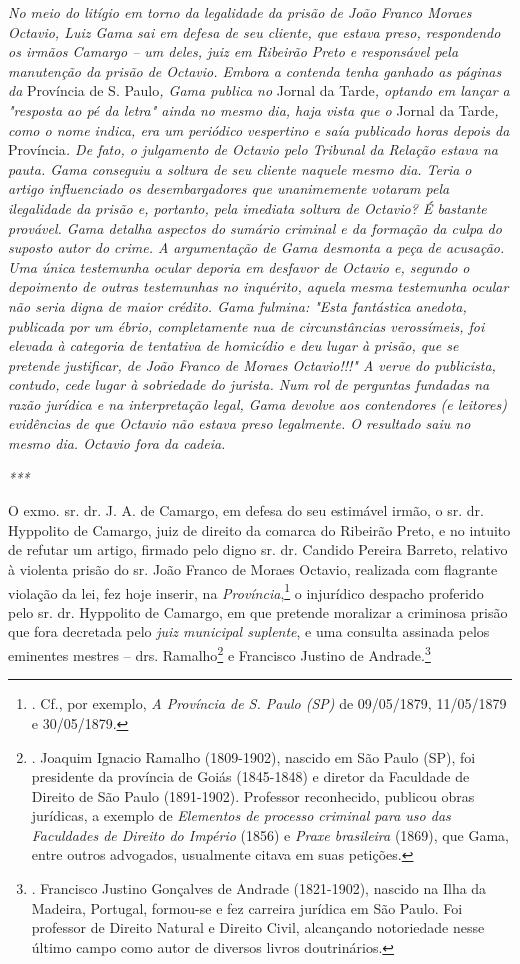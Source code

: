 \emph{No meio do litígio em torno da legalidade da prisão de João Franco
Moraes Octavio, Luiz Gama sai em defesa de seu cliente, que estava
preso, respondendo os irmãos Camargo -- um deles, juiz em Ribeirão Preto
e responsável pela manutenção da prisão de Octavio. Embora a contenda
tenha ganhado as páginas da} Província de S. Paulo\emph{, Gama publica
no} Jornal da Tarde\emph{, optando em lançar a "resposta ao pé da letra"
ainda no mesmo dia, haja vista que o} Jornal da Tarde\emph{, como o nome
indica, era um periódico vespertino e saía publicado horas depois da}
Província\emph{. De fato, o julgamento de Octavio pelo Tribunal da
Relação estava na pauta. Gama conseguiu a soltura de seu cliente naquele
mesmo dia. Teria o artigo influenciado os desembargadores que
unanimemente votaram pela ilegalidade da prisão e, portanto, pela
imediata soltura de Octavio? É bastante provável. Gama detalha aspectos
do sumário criminal e da formação da culpa do suposto autor do crime. A
argumentação de Gama desmonta a peça de acusação. Uma única testemunha
ocular deporia em desfavor de Octavio e, segundo o depoimento de outras
testemunhas no inquérito, aquela mesma testemunha ocular não seria digna
de maior crédito. Gama fulmina: "Esta fantástica anedota, publicada por
um ébrio, completamente nua de circunstâncias verossímeis, foi elevada à
categoria de tentativa de homicídio e deu lugar à prisão, que se
pretende justificar, de João Franco de Moraes Octavio!!!" A verve do
publicista, contudo, cede lugar à sobriedade do jurista. Num rol de
perguntas fundadas na razão jurídica e na interpretação legal, Gama
devolve aos contendores (e leitores) evidências de que Octavio não
estava preso legalmente. O resultado saiu no mesmo dia. Octavio fora da
cadeia.}

\emph{***}

O exmo. sr. dr. J. A. de Camargo, em defesa do seu estimável irmão, o
sr. dr. Hyppolito de Camargo, juiz de direito da comarca do Ribeirão
Preto, e no intuito de refutar um artigo, firmado pelo digno sr. dr.
Candido Pereira Barreto, relativo à violenta prisão do sr. João Franco
de Moraes Octavio, realizada com flagrante violação da lei, fez hoje
inserir, na \emph{Província},\footnote{. Cf., por exemplo, \emph{A
  Província de S. Paulo (SP)} de 09/05/1879, 11/05/1879 e 30/05/1879.} o
injurídico despacho proferido pelo sr. dr. Hyppolito de Camargo, em que
pretende moralizar a criminosa prisão que fora decretada pelo \emph{juiz
municipal suplente}, e uma consulta assinada pelos eminentes mestres --
drs. Ramalho\footnote{. Joaquim Ignacio Ramalho (1809-1902), nascido em
  São Paulo (SP), foi presidente da província de Goiás (1845-1848) e
  diretor da Faculdade de Direito de São Paulo (1891-1902). Professor
  reconhecido, publicou obras jurídicas, a exemplo de \emph{Elementos de
  processo criminal para uso das Faculdades de Direito do Império}
  (1856) e \emph{Praxe brasileira} (1869), que Gama, entre outros
  advogados, usualmente citava em suas petições.} e Francisco Justino de
Andrade.\footnote{. Francisco Justino Gonçalves de Andrade (1821-1902),
  nascido na Ilha da Madeira, Portugal, formou-se e fez carreira
  jurídica em São Paulo. Foi professor de Direito Natural e Direito
  Civil, alcançando notoriedade nesse último campo como autor de
  diversos livros doutrinários.}

